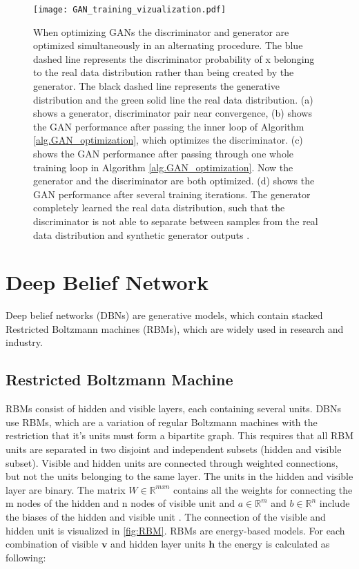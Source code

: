 \begin{figure}[p]
  \centering
  \texttt{[image: GAN\_training\_vizualization.pdf]}
  \caption{When optimizing GANs the discriminator and generator are optimized simultaneously in an alternating procedure. The blue dashed line represents the discriminator probability of x belonging to the real data distribution rather than being created by the generator. The black dashed line represents the generative distribution and the green solid line the real data distribution. (a) shows a generator, discriminator pair near convergence, (b) shows the GAN performance after passing the inner loop of Algorithm \ref{alg.GAN_optimization}, which optimizes the discriminator. (c) shows the GAN performance after passing through one whole training loop in Algorithm \ref{alg.GAN_optimization}. Now the generator and the discriminator are both optimized. (d) shows the GAN performance after several training iterations. The generator completely learned the real data distribution, such that the discriminator is not able to separate between samples from the real data distribution and synthetic generator outputs \cite{Goodfellow2014}.}
  \label{fig:GAN_training_vizualization}
\end{figure}

\section{Deep Belief Network}

Deep belief networks (DBNs) are generative models, which contain stacked Restricted Boltzmann machines (RBMs), which are widely used in research and industry.

\subsection{Restricted Boltzmann Machine}
RBMs consist of hidden and visible layers, each containing several units. DBNs use RBMs, which are a variation of regular Boltzmann machines with the restriction that it's units must form a bipartite graph. This requires that all RBM units are separated in two disjoint and independent subsets (hidden and visible subset). Visible and hidden units are connected through weighted connections, but not the units belonging to the same layer. The units in the hidden and visible layer are binary. The matrix $W \in \mathbb{R}^{mxn}$ contains all the weights for connecting the m nodes of the hidden and n nodes of visible unit and $a \in \mathbb{R}^{m}$ and $b \in \mathbb{R}^{n}$ include the biases of the hidden and visible unit \cite{Hinton2010}. The connection of the visible and hidden unit is visualized in \ref{fig:RBM}. RBMs are energy-based models. For each combination of visible $\mathbf{v}$ and hidden layer units $\mathbf{h}$ the energy is calculated as following:

